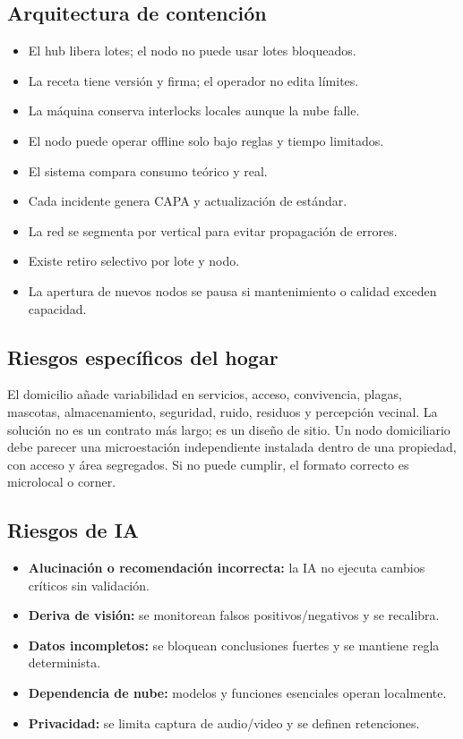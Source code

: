 \documentclass[11pt,a4paper]{article}
\begin{document}
\subsection{Arquitectura de contención}
\begin{itemize}
\item El hub libera lotes; el nodo no puede usar lotes bloqueados.
\item La receta tiene versión y firma; el operador no edita límites.
\item La máquina conserva interlocks locales aunque la nube falle.
\item El nodo puede operar offline solo bajo reglas y tiempo limitados.
\item El sistema compara consumo teórico y real.
\item Cada incidente genera CAPA y actualización de estándar.
\item La red se segmenta por vertical para evitar propagación de errores.
\item Existe retiro selectivo por lote y nodo.
\item La apertura de nuevos nodos se pausa si mantenimiento o calidad exceden capacidad.
\end{itemize}

\subsection{Riesgos específicos del hogar}
El domicilio añade variabilidad en servicios, acceso, convivencia, plagas, mascotas, almacenamiento,
seguridad, ruido, residuos y percepción vecinal. La solución no es un contrato más largo; es un diseño de
sitio. Un nodo domiciliario debe parecer una microestación independiente instalada dentro de una
propiedad, con acceso y área segregados. Si no puede cumplir, el formato correcto es microlocal o corner.

\subsection{Riesgos de IA}
\begin{itemize}
\item \textbf{Alucinación o recomendación incorrecta:} la IA no ejecuta cambios críticos sin validación.
\item \textbf{Deriva de visión:} se monitorean falsos positivos/negativos y se recalibra.
\item \textbf{Datos incompletos:} se bloquean conclusiones fuertes y se mantiene regla determinista.
\item \textbf{Dependencia de nube:} modelos y funciones esenciales operan localmente.
\item \textbf{Privacidad:} se limita captura de audio/video y se definen retenciones.
\end{itemize}
\end{document}
